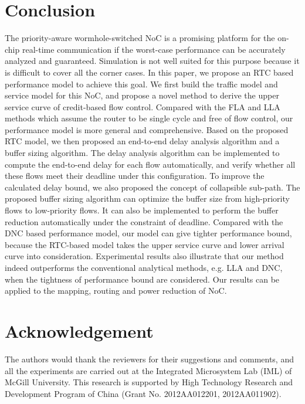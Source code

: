 \documentclass[10pt,journal]{IEEEtran}
\begin{document}
\section{Conclusion}\label{conclusion}
The priority-aware wormhole-switched NoC is a promising platform for the on-chip real-time communication if the worst-case performance can be accurately analyzed and guaranteed. Simulation is not well suited for this purpose because it is difficult to cover all the corner cases. In this paper, we propose an RTC based performance model to achieve this goal. We first build the traffic model and service model for this NoC, and propose a novel method to derive the upper service curve of credit-based flow control. Compared with the FLA and LLA methods which assume the router to be single cycle and free of flow control, our performance model is more general and comprehensive. Based on the proposed RTC model, we then proposed an end-to-end delay analysis algorithm and a buffer sizing algorithm. The delay analysis algorithm can be implemented to compute the end-to-end delay for each flow automatically, and verify whether all these flows meet their deadline under this configuration. To improve the calculated delay bound, we also proposed the concept of collapsible sub-path. The proposed buffer sizing algorithm can optimize the buffer size from high-priority flows to low-priority flows. It can also be implemented to perform the buffer reduction automatically under the constraint of deadline. Compared with the DNC based performance model, our model can give tighter performance bound, because the RTC-based model takes the upper service curve and lower arrival curve into consideration. Experimental results also illustrate that our method indeed outperforms the conventional analytical methods, e.g. LLA and DNC, when the tightness of performance bound are considered. Our results can be applied to the mapping, routing and power reduction of NoC.

\section*{Acknowledgement}
The authors would thank the reviewers for their suggestions and comments, and all the experiments are carried out at the Integrated Microsystem Lab (IML) of McGill University. This research is supported by High Technology Research and Development Program of China (Grant No. 2012AA012201, 2012AA011902).



\end{document}
